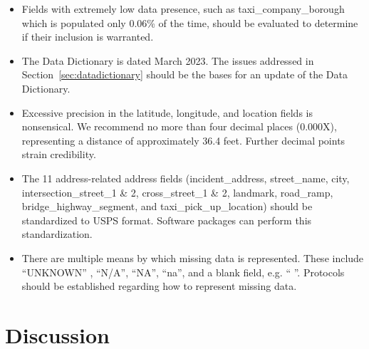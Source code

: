 \documentclass[12pt, titlepage]{article}
\begin{document}
\begin{itemize}
	\item Fields with extremely low data presence, such as taxi\_company\_borough 
	which is populated only 0.06\% of the time, should be evaluated 
	to determine if their inclusion is warranted.
	
	\item The Data Dictionary is dated March 2023. The issues addressed 
	in Section~\ref{sec:datadictionary} should be the bases for an update of
	the Data Dictionary.
	
	\item Excessive precision in the latitude, longitude, and location 
	fields is  nonsensical.  We recommend no more than 
	four decimal places (0.000X), representing a distance of approximately 
	36.4 feet. Further decimal points strain credibility.

	\item The 11 address-related address fields (incident\_address, 
	street\_name, city, intersection\_street\_1 \& 2, cross\_street\_1 \& 2,  
	landmark, road\_ramp, bridge\_highway\_segment, and 
	taxi\_pick\_up\_location) should be standardized to USPS format. Software 
	packages can perform this standardization. 
	
	\item There are multiple means by which missing data is 
	represented. These include ``UNKNOWN'' , ``N/A'', ``NA'', ``na'', and 
	a blank field, e.g. `` ''. Protocols should be established 
	regarding how to represent missing data.
\end{itemize}






\section{Discussion} \label{sec:discussion}



\end{document}
